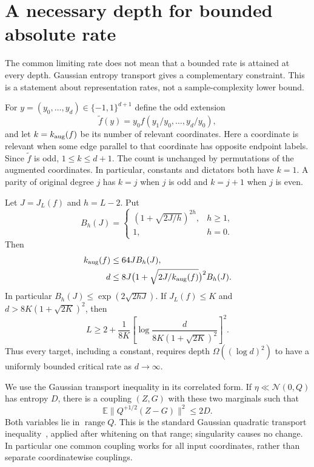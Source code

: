 \section{A necessary depth for bounded absolute rate}
\label{sec:critical-entropy-transport}

The common limiting rate does not mean that a bounded rate is attained
at every depth. Gaussian entropy transport gives a complementary
constraint. This is a statement about representation rates, not a
sample-complexity lower bound.

For $y=(y_0,\ldots,y_d)\in\{-1,1\}^{d+1}$ define the odd extension
\[
 \widetilde f(y)=y_0 f(y_1/y_0,\ldots,y_d/y_0),
\]
and let $k=k_{\rm aug}(f)$ be its number of relevant coordinates.
Here a coordinate is relevant when some edge parallel to that coordinate
has opposite endpoint labels. Since $\widetilde f$ is odd, $1\le k\le d+1$.
The count is unchanged by permutations of the augmented coordinates.
In particular, constants and dictators both have $k=1$. A parity of
original degree $j$ has $k=j$ when $j$ is odd and $k=j+1$ when $j$ is even.

\begin{theorem}
\label{thm:critical-entropy-transport}
Let $J=J_L(f)$ and $h=L-2$. Put
\[
 B_h(J)=
 \begin{cases}(1+\sqrt{2J/h})^{2h},&h\ge1,\\1,&h=0.\end{cases}
\]
Then
\begin{align}
 k_{\rm aug}(f)&\le64J B_h(J),
 \label{eq:critical-transport-relevance}\\
 d&\le8J\bigl(1+\sqrt{2J/k_{\rm aug}(f)}\bigr)^2 B_h(J).
 \label{eq:critical-transport-dimension}
\end{align}
In particular $B_h(J)\le\exp(2\sqrt{2hJ})$. If $J_L(f)\le K$ and
$d>8K(1+\sqrt{2K})^2$, then
\[
 L\ge2+\frac{1}{8K}
 \left[\log\frac{d}{8K(1+\sqrt{2K})^2}\right]^2.
\]
Thus every target, including a constant, requires depth
$\Omega((\log d)^2)$ to have a uniformly bounded critical rate as
$d\to\infty$.
\end{theorem}

We use the Gaussian transport inequality in its correlated form. If
$\eta\ll\mathcal N(0,Q)$ has entropy $D$, there is a coupling $(Z,G)$
with these two marginals such that
\begin{equation}
 \mathbb E\|Q^{+1/2}(Z-G)\|^2\le2D.
 \label{eq:critical-gaussian-transport}
\end{equation}
Both variables lie in $\operatorname{range}Q$. This is the standard
Gaussian quadratic transport inequality~\cite{talagrand}, applied after whitening on that
range; singularity causes no change. In particular one common coupling
works for all input coordinates, rather than separate coordinatewise
couplings.

